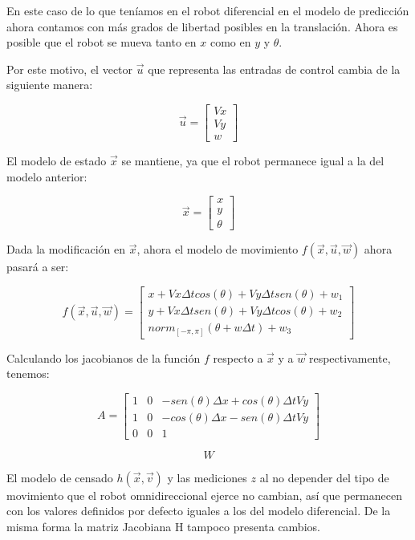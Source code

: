 En este caso de lo que teníamos en el robot diferencial en el modelo de predicción ahora contamos con más grados de libertad posibles en la translación. Ahora es posible que el robot se mueva tanto en $x$ como en $y$ y $\theta$.

Por este motivo, el vector $\overrightarrow{u}$ que representa las entradas de control cambia de la siguiente manera:

$$\overrightarrow{u} = \begin{bmatrix}
         Vx \\
         Vy \\
         w 
        \end{bmatrix}$$


El modelo de estado $\overrightarrow{x}$ se mantiene, ya que el robot permanece igual a la del modelo anterior:

$$\overrightarrow{x} = \begin{bmatrix}
         x \\
         y \\
         \theta 
        \end{bmatrix}$$

Dada la modificación en $\overrightarrow{x}$, ahora el modelo de movimiento $f(\overrightarrow{x},\overrightarrow{u}, \overrightarrow{w})$ ahora pasará a ser:

$$f(\overrightarrow{x},\overrightarrow{u}, \overrightarrow{w})= \begin{bmatrix}
         x + Vx \Delta t cos(\theta) + Vy \Delta t sen(\theta) + w_1 \\
         y + Vx \Delta t sen(\theta) + Vy \Delta t cos(\theta) + w_2 \\
         norm_{[-\pi,\pi]} (\theta + w \Delta t) + w_3
         \end{bmatrix}$$

Calculando los jacobianos de la función $f$ respecto a $\overrightarrow{x}$ y a $\overrightarrow{w}$ respectivamente, tenemos:

$$A= \begin{bmatrix}
         1 & 0 & -sen(\theta)\Delta x + cos(\theta) \Delta t V y\\
         1 & 0 & -cos(\theta)\Delta x - sen(\theta) \Delta t V y \\
         0 & 0 & 1
         \end{bmatrix}$$

$$W$$

El modelo de censado $h(\overrightarrow{x},\overrightarrow{v})$ y las mediciones $z$ al no depender del tipo de movimiento que el robot omnidireccional ejerce no cambian, así que permanecen con los valores definidos por defecto iguales a los del modelo diferencial. De la misma forma la matriz Jacobiana H tampoco presenta cambios.

